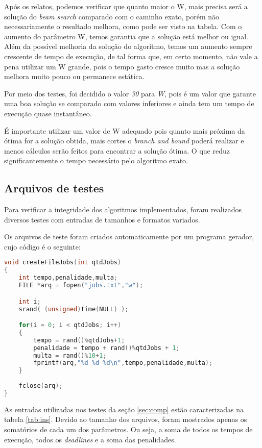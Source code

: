 \documentclass[
	11pt,				%
	oneside,			%
	a4paper,			%
	english,			%
	brazil,				%
	]{article}
\begin{document}
Após os relatos, podemos verificar que quanto maior o W, mais precisa será a solução do \textit{beam search} comparado com o caminho exato, porém não necessariamente o resultado melhora, como pode ser visto na tabela. Com o aumento do parâmetro W, temos garantia que a solução está melhor ou igual. Além da possível melhoria da solução do algoritmo, temos um aumento sempre crescente de tempo de execução, de tal forma que, em certo momento, não vale a pena utilizar um W grande, pois o tempo gasto cresce muito mas a solução melhora muito pouco ou permanece estática.

Por meio dos testes, foi decidido o valor \textit{30} para \textit{W}, pois é um valor que garante uma boa solução se comparado com valores inferiores e ainda tem um tempo de execução quase instantâneo.

É importante utilizar um valor de W adequado pois quanto mais próxima da ótima for a solução obtida, mais cortes o \textit{branch and bound} poderá realizar e menos cálculos serão feitos para encontrar a solução ótima. O que reduz significantemente o tempo necessário pelo algoritmo exato.

\subsection{Arquivos de testes}
\label{sec:arqvtestes}
Para verificar a integridade dos algoritmos implementados, foram realizados diversos testes com entradas de tamanhos e formatos variados.

Os arquivos de teste foram criados automaticamente por um programa gerador, cujo código é o seguinte:

\begin{lstlisting}[language=C, caption=Gerador de Jobs]
void createFileJobs(int qtdJobs)
{
	int tempo,penalidade,multa;
	FILE *arq = fopen("jobs.txt","w");

	int i;
	srand( (unsigned)time(NULL) );

	for(i = 0; i < qtdJobs; i++)
	{
		tempo = rand()%qtdJobs+1;
		penalidade = tempo + rand()%qtdJobs + 1;
		multa = rand()%10+1; 
		fprintf(arq,"%d %d %d\n",tempo,penalidade,multa);
	}
	
	fclose(arq);
}
\end{lstlisting}

As entradas utilizadas nos testes da seção \ref{sec:comp} estão caracterizadas na tabela \ref{tab:ins}. Devido ao tamanho dos arquivos, foram mostrados apenas os somatórios de cada um dos parâmetros. Ou seja, a soma de todos os tempos de execução, todos os \textit{deadlines} e a soma das penalidades.
\end{document}

